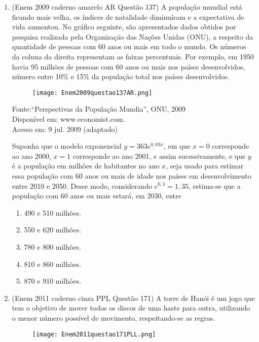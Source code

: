 \begin{enumerate}
	\item (Enem 2009 caderno amarelo AR Questão 137) A população mundial está ficando mais velha, os índices de natalidade diminuíram e a expectativa de vida aumentou. No gráfico seguinte, são apresentados dados obtidos por pesquisa realizada pela Organização das Nações Unidas (ONU), a respeito da quantidade de pessoas com 60 anos ou mais em todo o mundo. Os números da coluna da direita representam as faixas percentuais. Por exemplo, em 1950 havia 95 milhões de pessoas com 60 anos ou mais nos países desenvolvidos, número entre 10\% e 15\% da população total nos países desenvolvidos.
	\begin{figure}[H]
		\centering
		\texttt{[image: Enem2009questao137AR.png]}
		\caption{}
		\label{fig:enem2009questao137ar}
	\end{figure}		
	\begin{flushright}
		{\tiny Fonte:``Perspectivas da População Mundia'', ONU, 2009\\
			Disponível em: www.economist.com.\\ 
			Acesso em: 9 jul. 2009 (adaptado)\\}
	\end{flushright}
	
	Suponha que o modelo exponencial $ y=363e^{0,03x} $, em que $ x=0 $ corresponde ao ano 2000, $ x=1 $ corresponde ao ano 2001, e assim sucessivamente, e que $ y $ é a população em milhões de habitantes no ano $ x $, seja usado para estimar essa população com 60 anos ou mais de idade nos países em desenvolvimento entre 2010 e 2050.
	Desse modo, considerando $ e^{0,3}=1,35 $, estima-se que a população com 60 anos ou mais estará, em 2030, entre
	\begin{enumerate}
		\item 490 e 510 milhões.
		\item 550 e 620 milhões.
		\item 780 e 800 milhões.
		\item 810 e 860 milhões.
		\item 870 e 910 milhões. 
	\end{enumerate}
	\clearpage
	\item (Enem 2011 caderno cinza PPL Questão 171) A torre de Hanói é um jogo que tem o objetivo de mover todos os discos de uma haste para outra, utilizando o menor número possível de movimento, respeitando-se as regras.
	\begin{figure}[H]
		\centering
		\texttt{[image: Enem2011questao171PLL.png]}
		\caption{}
		\label{fig:enem2011questao171pll}
	\end{figure}
	

\end{enumerate}
